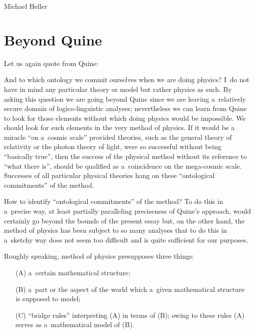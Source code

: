 \begin{artengenv}{Michael Heller}
\section{Beyond Quine}
Let us again quote from Quine:

And to which ontology we commit ourselves when we are doing physics? I~do not have in mind any particular theory or
model but rather physics as such. By asking this question we are going beyond Quine since we are leaving a~relatively
secure domain of logico-linguistic analyses; nevertheless we can learn from Quine to look for those elements without
which doing physics would be impossible. We should look for such elements in the very method of physics. If it would be
a miracle ``on a~cosmic scale'' provided theories, such as the general theory of relativity or the photon theory of
light, were so successful without being ``basically true'', then the success of the physical method without its reference
to ``what there is'', should be qualified as a~coincidence on the mega-cosmic scale. Successes of all particular physical
theories hang on these ``ontological commitments'' of the method.

How to identify ``ontological commitments'' of the method? To do this in a~precise way, at least partially paralleling
preciseness of Quine’s approach, would certainly go beyond the bounds of the present essay but, on the other hand, the
method of physics has been subject to so many analyses that to do this in a~sketchy way does not seem too difficult and
is quite sufficient for our purposes.

Roughly speaking, method of physics presupposes three things:

\begin{enumerate}
\item[(A)] a~certain mathematical structure;
\item[(B)] a~part or the aspect of the world which a~given mathematical structure is supposed to model;
\item[(C)]  ``bridge rules'' interpreting (A) in terms of (B); owing to these rules (A) serves as a~mathematical model of (B).
\end{enumerate}


\end{artengenv}
